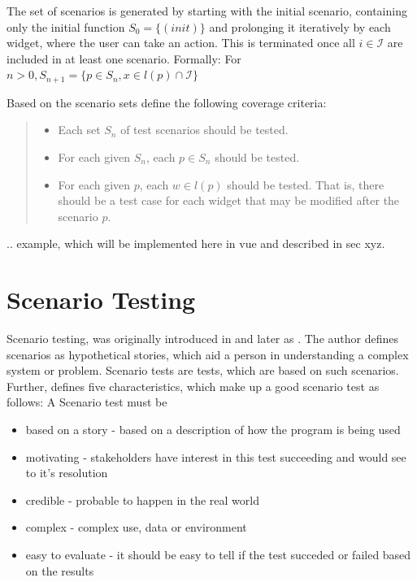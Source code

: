 The set of scenarios is generated by starting with the initial scenario, containing only the initial function $S_0 = \{(init)\}$ and prolonging it iteratively by each widget, where the user can take an action. This is terminated once all $i \in \mathcal{I}$ are included in at least one scenario. Formally: For $n > 0, S_{n+1}= \{p \in S_n, x \in l(p) \cap \mathcal{I}\}$ 

Based on the scenario sets \textcite{zhang2019scenario} define the following coverage criteria:
\begin{quote}
  

\begin{itemize}
  \item Each set $S_n$ of test scenarios should be tested.
  \item For each given $S_n$, each $p \in S_n$ should be tested.
  \item For each given $p$, each $w \in l(p)$ should be tested. That is, there should be a
  test case for each widget that may be modified after the scenario $p$.
\end{itemize} 
\end{quote}
.. example, which will be implemented here in vue and described in sec xyz. 


\section{Scenario Testing}
Scenario testing, was originally introduced in \textcite{kaner2003power} and later as \textcite{kaner2013introduction}. The author defines scenarios as hypothetical stories, which aid a person in understanding a complex system or problem. Scenario tests are tests, which are based on such scenarios.  \parencite[1]{kaner2013introduction}
Further, \parencite[2-5]{kaner2003power} defines five characteristics, which make up a good scenario test as follows:
A Scenario test must be
\begin{itemize}
     \item based on a story - based on a description of how the program is being used
    \item motivating - stakeholders have interest in this test succeeding and would see to it's resolution
    \item credible - probable to happen in the real world
    \item complex - complex use, data or environment
    \item easy to evaluate - it should be easy to tell if the test succeded or failed based on the results 
\end{itemize}

